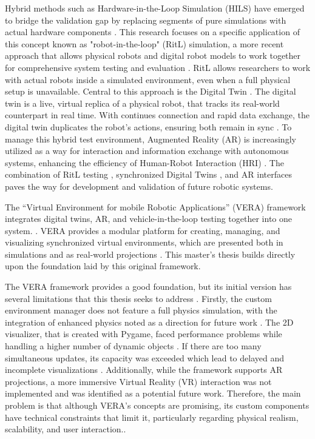 Hybrid methods such as Hardware-in-the-Loop Simulation (HILS) have emerged to bridge the validation gap by replacing segments of pure simulations with actual hardware components \cite{Hu05}. This research focuses on a specific application of this concept known as "robot-in-the-loop" (RitL) simulation, a more recent approach that allows physical robots and digital robot models to work together for comprehensive system testing and evaluation \cite{Hu05}. RitL allows researchers to work with actual robots inside a simulated environment, even when a full physical setup is unavailable\cite{Hu05}. Central to this approach is the Digital Twin \cite{AA23}. The digital twin is a live, virtual replica of a physical robot, that tracks its real-world counterpart in real time\cite{AA23}. With continues connection and rapid data exchange, the digital twin duplicates the robot’s actions, ensuring both remain in sync \cite{AA23}. To manage this hybrid test environment, Augmented Reality (AR) is increasingly utilized as a way for interaction and information exchange with autonomous systems, enhancing the efficiency of Human-Robot Interaction (HRI) \cite{MV20}. The combination of RitL testing \cite{Hu05}, synchronized Digital Twins \cite{AA23}, and AR interfaces \cite{MV20} paves the way for development and validation of future robotic systems.

The “Virtual Environment for mobile Robotic Applications” (VERA) framework integrates digital twins, AR, and vehicle-in-the-loop testing together into one system. \cite{Geh24}. VERA provides a modular platform for creating, managing, and visualizing synchronized virtual environments, which are presented both in simulations and as real-world projections \cite{Geh24}. This master's thesis builds directly upon the foundation laid by this original framework.

The VERA framework provides a good foundation, but its initial version has several limitations that this thesis seeks to address \cite{Geh24}. Firstly, the custom environment manager does not feature a full physics simulation, with the integration of enhanced physics noted as a direction for future work \cite{Geh24}. The 2D visualizer, that is created with Pygame, faced performance problems while handling a higher number of dynamic objects \cite{Geh24}. If there are too many simultaneous updates, its capacity was exceeded which lead to delayed and incomplete visualizations \cite{Geh24}. Additionally, while the framework supports AR projections, a more immersive Virtual Reality (VR) interaction was not implemented and was identified as a potential future work\cite{Geh24}. Therefore, the main problem is that although VERA’s concepts are promising, its custom components have technical constraints that limit it, particularly regarding physical realism, scalability, and user interaction.\cite{Geh24}.

